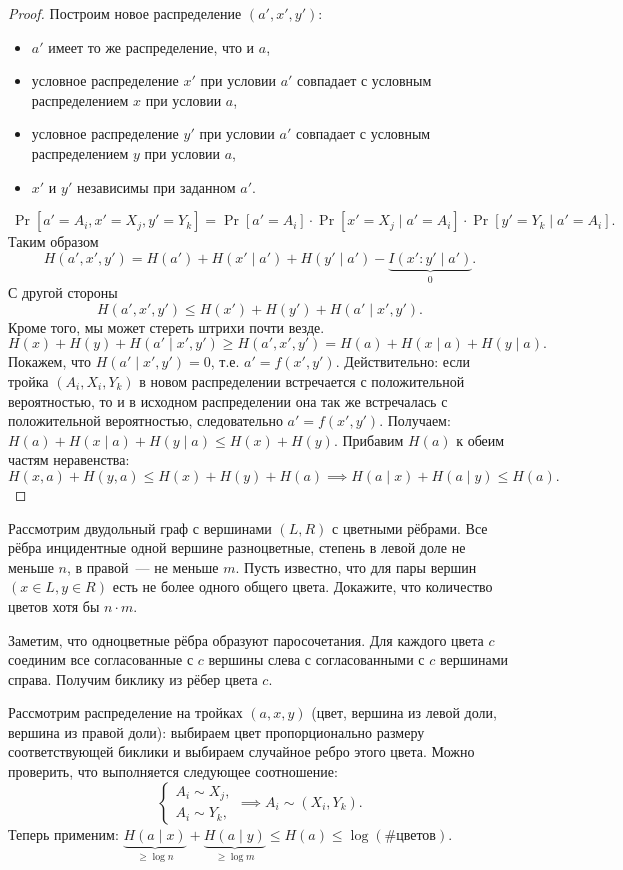 \documentclass[12pt]{article}
\begin{document}
\begin{proof}
    Построим новое распределение $(a',x',y')$:
    \begin{itemize}
        \item $a'$ имеет то же распределение, что и $a$,
        \item условное распределение $x'$ при условии $a'$ совпадает
            с условным распределением $x$ при условии $a$,
        \item условное распределение $y'$ при условии $a'$ совпадает
            с условным распределением $y$ при условии $a$,
        \item $x'$ и $y'$ независимы при заданном $a'$.
    \end{itemize}
    \[\
    \Pr[a'=A_i, x' = X_j, y' = Y_k] = 
    \Pr[a'=A_i]\cdot \Pr[x' = X_j\mid a'=A_i]\cdot \Pr[y' = Y_k\mid a' = A_i].
    \]
    Таким образом
    \[
        H(a',x',y') = H(a') + H(x'\mid a') + H(y'\mid a') - \underbrace{I(x':y'\mid a')}_{0}.
    \]
    С другой стороны
    \[
        H(a',x',y') \le H(x') + H(y') + H(a'\mid x',y').
    \]
    Кроме того, мы может стереть штрихи почти везде.
    \[
        H(x) + H(y) + H(a'\mid x',y') \ge H(a',x',y') = H(a) + H(x\mid a) + H(y\mid a).
    \]
    Покажем, что $H(a'\mid x', y') = 0$, т.е. $a' = f(x',y')$. Действительно: 
    если тройка $(A_i, X_i, Y_k)$ в новом распределении встречается с положительной
    вероятностью, то и в исходном распределении она так же встречалась с положительной
    вероятностью, следовательно $a' = f(x',y')$.
    Получаем: $H(a) + H(x\mid a) + H(y\mid a) \le H(x) + H(y)$. Прибавим $H(a)$ к обеим частям
    неравенства:
    \[
       H(x,a) + H(y,a) \le H(x) + H(y) + H(a)\implies H(a\mid x) + H(a \mid y) \le H(a).
    \]
\end{proof}
\begin{problem}[Верещагин]
    Рассмотрим двудольный граф с вершинами $(L,R)$ с цветными рёбрами.
    Все рёбра инцидентные одной вершине разноцветные, степень в левой доле не меньше $n$, 
    в правой~--- не меньше $m$. Пусть известно, что для пары вершин $(x\in L, y\in R)$
    есть не более одного общего цвета. Докажите, что количество цветов хотя бы $n\cdot m$.

    Заметим, что одноцветные рёбра образуют паросочетания. Для каждого цвета $c$ соединим все
    согласованные с $c$ вершины слева с согласованными с $c$ вершинами справа. Получим биклику из
    рёбер цвета $c$.

    Рассмотрим распределение на тройках $(a,x,y)$ (цвет, вершина из левой доли, вершина из правой
    доли): выбираем цвет пропорционально размеру соответствующей биклики и выбираем случайное ребро
    этого цвета. Можно проверить, что выполняется следующее соотношение:
\[
    \begin{cases}
        A_i \sim X_j,\\
        A_i \sim Y_k,
    \end{cases} \implies A_i\sim(X_i,Y_k).
\]
Теперь применим: $\underbrace{H(a\mid x)}_{\ge\log n} + 
                  \underbrace{H(a\mid y)}_{\ge\log m} \le H(a) \le \log (\text{\# цветов})$.
\end{problem}
\end{document}
